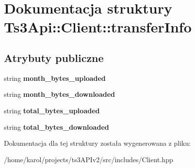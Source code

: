 \hypertarget{struct_ts3_api_1_1_client_1_1transfer_info}{}\section{Dokumentacja struktury Ts3\+Api\+:\+:Client\+:\+:transfer\+Info}
\label{struct_ts3_api_1_1_client_1_1transfer_info}
\subsection*{Atrybuty publiczne}
\begin{DoxyCompactItemize}
\item 
string {\bfseries month\+\_\+bytes\+\_\+uploaded}\hypertarget{struct_ts3_api_1_1_client_1_1transfer_info_a487dfecb58a865b099ead7e1ef8e9dbf}{}\label{struct_ts3_api_1_1_client_1_1transfer_info_a487dfecb58a865b099ead7e1ef8e9dbf}

\item 
string {\bfseries month\+\_\+bytes\+\_\+downloaded}\hypertarget{struct_ts3_api_1_1_client_1_1transfer_info_a5051375ed95b8aa5babc0cb5acd435df}{}\label{struct_ts3_api_1_1_client_1_1transfer_info_a5051375ed95b8aa5babc0cb5acd435df}

\item 
string {\bfseries total\+\_\+bytes\+\_\+uploaded}\hypertarget{struct_ts3_api_1_1_client_1_1transfer_info_a4932b3fb406e759c6afe5e1e76935104}{}\label{struct_ts3_api_1_1_client_1_1transfer_info_a4932b3fb406e759c6afe5e1e76935104}

\item 
string {\bfseries total\+\_\+bytes\+\_\+downloaded}\hypertarget{struct_ts3_api_1_1_client_1_1transfer_info_aaee3872daf3bc112e7d7042d5b7bcebc}{}\label{struct_ts3_api_1_1_client_1_1transfer_info_aaee3872daf3bc112e7d7042d5b7bcebc}

\end{DoxyCompactItemize}


Dokumentacja dla tej struktury została wygenerowana z pliku\+:\begin{DoxyCompactItemize}
\item 
/home/karol/projects/ts3\+A\+P\+Iv2/src/includes/Client.\+hpp\end{DoxyCompactItemize}

